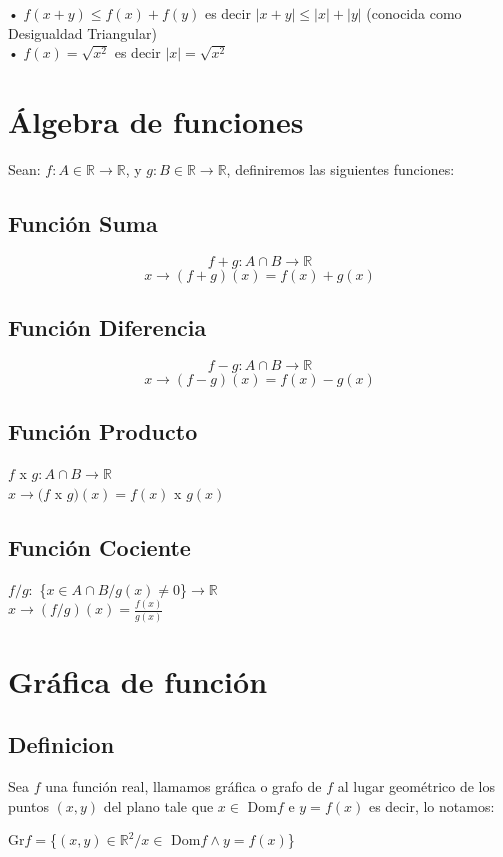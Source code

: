 • $f(x+y) \leqslant f(x)+f(y)$ es decir $|x+y| \leqslant |x|+|y|$ (conocida como Desigualdad Triangular)\\

• $f(x) = \sqrt{x^{2}}$ es decir $|x|=\sqrt{x^{2}}$

\section{Álgebra de funciones}Sean: $f: A \in \mathbb{R} \longrightarrow \mathbb{R}$, y
			$g: B \in \mathbb{R} \longrightarrow \mathbb{R}$, definiremos las siguientes funciones:
\subsection{Función Suma}
$$f+g:A \cap B \longrightarrow \mathbb{R}$$
$$x \longrightarrow (f+g)(x)= f(x)+g(x)$$
\subsection{Función Diferencia}
$$f-g:A \cap B \longrightarrow \mathbb{R}$$
$$x \longrightarrow (f-g)(x)= f(x)-g(x)$$
\subsection{Función Producto}
\begin{center}
$f$ x $g:A \cap B \longrightarrow \mathbb{R}$\\
$x \longrightarrow (f$ x $g)(x)= f(x)$ x $g(x)$
\end{center}
\subsection{Función Cociente}
\begin{center}
$f/g:$ \{$x \in A \cap B / g(x)\neq0$\}$ \longrightarrow \mathbb{R}$\\
$x \longrightarrow (f/g)(x)= \frac{f(x)}{g(x)}$
\end{center}

\section{Gráfica de función}
\subsection{Definicion}
Sea $f$ una función real, llamamos gráfica o grafo de $f$ al lugar geométrico de los puntos $(x,y)$ del plano tale que $x \in $ Dom$f$ e $y=f(x)$ es decir, lo notamos:\\
\begin{center}
Gr$f=$\{$(x,y) \in \mathbb{R} ^{2} / x \in $ Dom$f \wedge y=f(x)$\}
\end{center}
